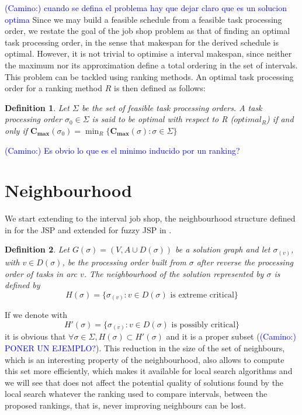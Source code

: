 \documentclass[preprint]{elsarticle}
\newcommand{\textcam}[1]{\textcolor{blue}{(Camino:) #1}}
\newtheorem{definition}{Definition}
\begin{document}
\textcam{cuando se defina el problema hay que dejar claro que es un solucion optima}
Since we may build a feasible schedule from a feasible task processing order, we restate the goal of the job shop problem as that of finding an optimal task processing order, in the sense that makespan for the derived schedule is optimal. However, it is not trivial to optimise a interval makespan, since neither the maximum nor its approximation define a total ordering in the set of intervals. This problem can be tackled using ranking methods. An optimal task processing order for a ranking method $R$ is then defined as follows:
\begin{definition}
Let $\Sigma$ be the set of feasible task processing orders. A task processing order $\sigma_0 \in \Sigma$ is said to be \emph{optimal with respect to R} ($optimal_R$) if and only if $\mathbf{C_{max}}(\sigma_0) = \min_R{ \{\mathbf{C_{max}}(\sigma): \sigma \in \Sigma \}}$
\end{definition}
\textcam{Es obvio lo que es el minimo inducido por un ranking?}

\section{Neighbourhood}
We start extending to the interval job shop, the neighbourhood structure defined in \cite{Vanlaarhoven1992} for the JSP and extended for fuzzy JSP in \cite{GonzalezRodriguez2008b}. 

\begin{definition}
Let $G(\sigma)= (V, A \cup D(\sigma))$ be a solution graph and let $\sigma_{(v)}$, with $v \in D(\sigma)$, be the processing order built from $\sigma$ after reverse the processing order of tasks in arc $v$. The neighbourhood of the solution represented by $\sigma$ is defined by 
\begin{equation}
H(\sigma) = \{\sigma_{(v)}: v \in D(\sigma) \text{ is extreme critical}\}
\end{equation} 
\end{definition}

If we denote with $$H'(\sigma) = \{\sigma_{(v)}: v \in D(\sigma) \text{ is possibly critical}\}$$ it is obvious that $\forall \sigma \in \Sigma, H(\sigma) \subset H'(\sigma)$ and it is a proper subset (\textcam{PONER UN EJEMPLO?}). This reduction in the size of the set of neighbours, which is an interesting property of the neighbourhood, also allows to compute this set more efficiently, which makes it available for local search algorithms and we will see that does not affect the potential quality of solutions found by the local search whatever the ranking used to compare intervals, between the proposed rankings, that is, never improving neighbours can be lost.
\end{document}
